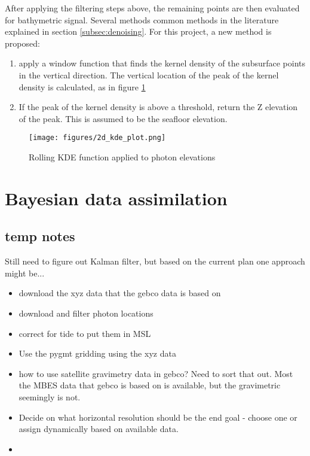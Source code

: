 After applying the filtering steps above, the remaining points are then evaluated for bathymetric signal. Several methods common methods in the literature explained in section \ref{subsec:denoising}. For this project, a new method is proposed:


\begin{enumerate}
    \item apply a window function that finds the kernel density of the subsurface points in the vertical direction. The vertical location of the peak of the kernel density is calculated, as in figure \ref{fig:kdefunc}
    \item If the peak of the kernel density is above a threshold, return the Z elevation of the peak. This is assumed to be the seafloor elevation.
\end{enumerate}

\begin{figure}[htbp]
    \centering
    \texttt{[image: figures/2d\_kde\_plot.png]}
    \caption{Rolling KDE function applied to photon elevations}
    \label{fig:kdefunc}
\end{figure}

\section{Bayesian data assimilation}
\subsection{temp notes}
Still need to figure out Kalman filter, but based on the current plan one approach might be...
\begin{itemize}
    \color{orange}
    \item download the xyz data that the gebco data is based on
    \item download and filter photon locations
    \item correct for tide to put them in MSL
    \item Use the pygmt gridding using the xyz data
    \item how to use satellite gravimetry data in gebco? Need to sort that out. Most the MBES data that gebco is based on is available, but the gravimetric seemingly is not.
    \item Decide on what horizontal resolution should be the end goal - choose one or assign dynamically based on available data. 
    \item 
\end{itemize}


